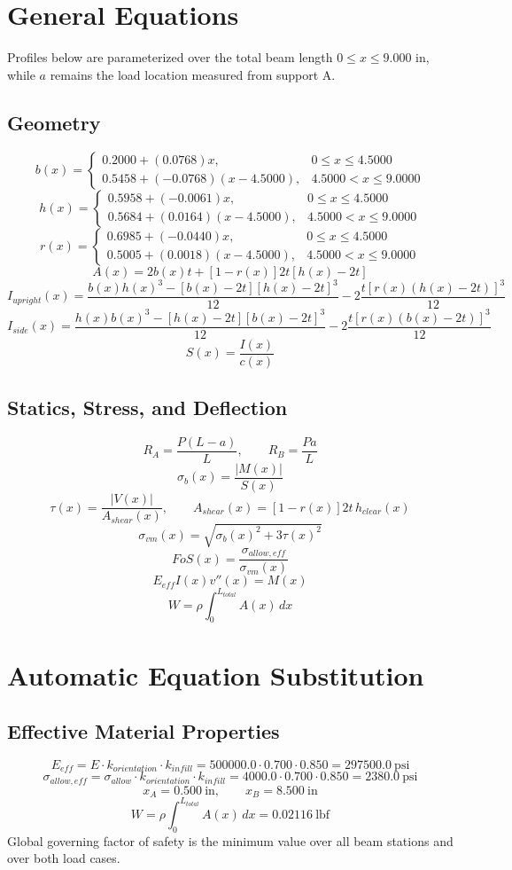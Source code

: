 \documentclass[11pt]{article}
\begin{document}
\section*{General Equations}
Profiles below are parameterized over the total beam length $0 \le x \le 9.000$ in, while $a$ remains the load location measured from support A.
\subsection*{Geometry}
\[
b(x)=\begin{cases}0.2000 + (0.0768)x, & 0 \le x \le 4.5000\\0.5458 + (-0.0768)(x-4.5000), & 4.5000 < x \le 9.0000\end{cases}
\]
\[
h(x)=\begin{cases}0.5958 + (-0.0061)x, & 0 \le x \le 4.5000\\0.5684 + (0.0164)(x-4.5000), & 4.5000 < x \le 9.0000\end{cases}
\]
\[
r(x)=\begin{cases}0.6985 + (-0.0440)x, & 0 \le x \le 4.5000\\0.5005 + (0.0018)(x-4.5000), & 4.5000 < x \le 9.0000\end{cases}
\]
\[
A(x)=2b(x)t+[1-r(x)]2t[h(x)-2t]
\]
\[
I_{upright}(x)=\frac{b(x)h(x)^3-[b(x)-2t][h(x)-2t]^3}{12}-2\frac{t[r(x)(h(x)-2t)]^3}{12}
\]
\[
I_{side}(x)=\frac{h(x)b(x)^3-[h(x)-2t][b(x)-2t]^3}{12}-2\frac{t[r(x)(b(x)-2t)]^3}{12}
\]
\[
S(x)=\frac{I(x)}{c(x)}
\]

\subsection*{Statics, Stress, and Deflection}
\[
R_A=\frac{P(L-a)}{L}, \qquad R_B=\frac{Pa}{L}
\]
\[
\sigma_b(x)=\frac{|M(x)|}{S(x)}
\]
\[
\tau(x)=\frac{|V(x)|}{A_{shear}(x)}, \qquad A_{shear}(x)=[1-r(x)]2t\,h_{clear}(x)
\]
\[
\sigma_{vm}(x)=\sqrt{\sigma_b(x)^2+3\tau(x)^2}
\]
\[
FoS(x)=\frac{\sigma_{allow,eff}}{\sigma_{vm}(x)}
\]
\[
E_{eff}I(x)v''(x)=M(x)
\]
\[
W=\rho\int_0^{L_{total}} A(x)\,dx
\]

\section*{Automatic Equation Substitution}
\subsection*{Effective Material Properties}
\[E_{eff} = E \cdot k_{orientation} \cdot k_{infill} = 500000.0 \cdot 0.700 \cdot 0.850 = 297500.0\ \mathrm{psi}\]
\[\sigma_{allow,eff} = \sigma_{allow} \cdot k_{orientation} \cdot k_{infill} = 4000.0 \cdot 0.700 \cdot 0.850 = 2380.0\ \mathrm{psi}\]
\[x_A = 0.500\ \mathrm{in}, \qquad x_B = 8.500\ \mathrm{in}\]
\[W = \rho \int_0^{L_{total}} A(x)\,dx = 0.02116\ \mathrm{lbf}\]
Global governing factor of safety is the minimum value over all beam stations and over both load cases.
\end{document}
